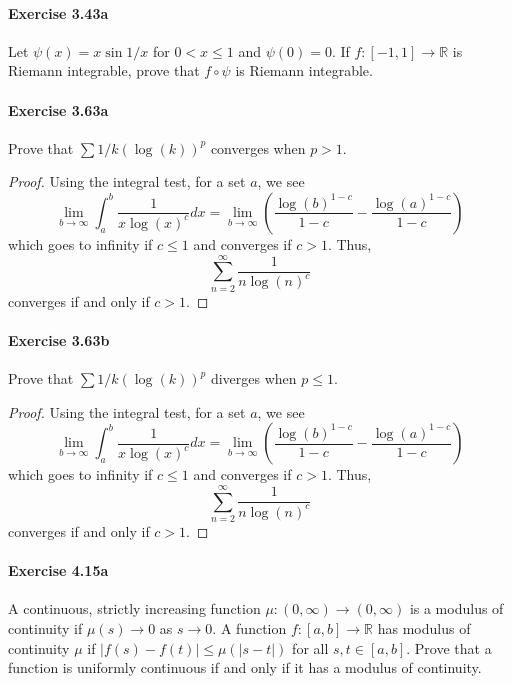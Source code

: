 \documentclass{article}
\begin{document}
\paragraph{Exercise 3.43a} Let $\psi(x) = x \sin 1/x$ for $0 < x \leq 1$ and $\psi(0) = 0$.  If $f \colon [-1, 1] \rightarrow \mathbb{R}$ is Riemann integrable, prove that $f \circ \psi$ is Riemann integrable.


\paragraph{Exercise 3.63a} Prove that $\sum 1/k(\log(k))^p$ converges when $p > 1$.
\begin{proof}
    Using the integral test, for a set $a$, we see
$$
\lim _{b \rightarrow \infty} \int_a^b \frac{1}{x \log (x)^c} d x=\lim _{b \rightarrow \infty}\left(\frac{\log (b)^{1-c}}{1-c}-\frac{\log (a)^{1-c}}{1-c}\right)
$$
which goes to infinity if $c \leq 1$ and converges if $c>1$. Thus,
$$
\sum_{n=2}^{\infty} \frac{1}{n \log (n)^c}
$$
converges if and only if $c>1$. 
\end{proof}



\paragraph{Exercise 3.63b} Prove that $\sum 1/k(\log(k))^p$ diverges when $p \leq 1$.
\begin{proof} 
    Using the integral test, for a set $a$, we see
$$
\lim _{b \rightarrow \infty} \int_a^b \frac{1}{x \log (x)^c} d x=\lim _{b \rightarrow \infty}\left(\frac{\log (b)^{1-c}}{1-c}-\frac{\log (a)^{1-c}}{1-c}\right)
$$
which goes to infinity if $c \leq 1$ and converges if $c>1$. Thus,
$$
\sum_{n=2}^{\infty} \frac{1}{n \log (n)^c}
$$
converges if and only if $c>1$. 
\end{proof}



\paragraph{Exercise 4.15a} A continuous, strictly increasing function $\mu \colon (0, \infty) \rightarrow (0, \infty)$ is a modulus of continuity if $\mu(s) \rightarrow 0$ as $s \rightarrow 0$. A function $f \colon [a, b] \rightarrow \mathbb{R}$ has modulus of continuity $\mu$ if $|f(s) - f(t)| \leq \mu(|s - t|)$ for all $s, t \in [a, b]$. Prove that a function is uniformly continuous if and only if it has a modulus of continuity.
\end{document}
